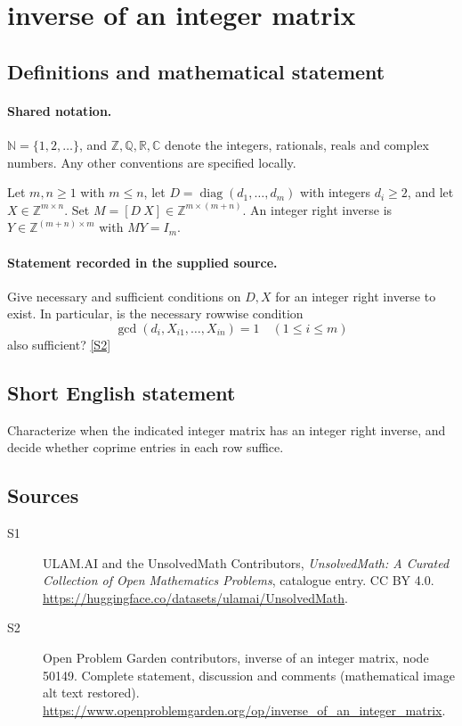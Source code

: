 \documentclass[11pt]{book}
\newcommand{\sref}[2]{\hyperlink{source:#1:#2}{[S#2]}}
\begin{document}
\section{inverse of an integer matrix}\label{statement}

\subsection{Definitions and mathematical statement}

\paragraph{Shared notation.}$\mathbb N=\{1,2,\ldots\}$, and $\mathbb Z,\mathbb Q,\mathbb R,\mathbb C$ denote the integers, rationals, reals and complex numbers. Any other conventions are specified locally.


Let $m,n\geq1$ with $m\leq n$, let $D=\operatorname{diag}(d_1,\ldots,d_m)$ with integers $d_i\geq2$, and let $X\in\mathbb Z^{m\times n}$. Set $M=[D\ X]\in\mathbb Z^{m\times(m+n)}$. An integer right inverse is $Y\in\mathbb Z^{(m+n)\times m}$ with $MY=I_m$.
\paragraph{Statement recorded in the supplied source.}
Give necessary and sufficient conditions on $D,X$ for an integer right inverse to exist. In particular, is the necessary rowwise condition
\[\gcd(d_i,X_{i1},\ldots,X_{in})=1\quad(1\leq i\leq m)\]
also sufficient? \sref{statement}{2}
\subsection{Short English statement}
Characterize when the indicated integer matrix has an integer right inverse, and decide whether coprime entries in each row suffice.
\subsection{Sources}
\begin{description}
\item[\hypertarget{source:statement:1}{S1}] ULAM.AI and the UnsolvedMath Contributors, \emph{UnsolvedMath: A Curated Collection of Open Mathematics Problems}, catalogue entry. CC BY 4.0. \url{https://huggingface.co/datasets/ulamai/UnsolvedMath}.
\item[\hypertarget{source:statement:2}{S2}] Open Problem Garden contributors, inverse of an integer matrix, node 50149. Complete statement, discussion and comments (mathematical image alt text restored). \url{https://www.openproblemgarden.org/op/inverse_of_an_integer_matrix}.
\end{description}
\label{end:statement}
\end{document}

